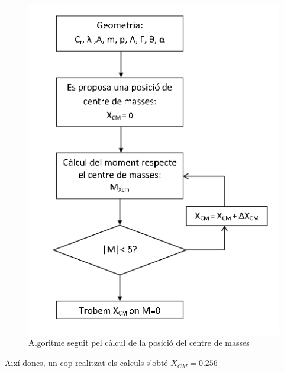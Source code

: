 \begin{figure}[h]
	\centering
	\includegraphics[scale=0.5]{./plots/algoritmeCM}
	\caption{Algoritme seguit pel càlcul de la posició del centre de masses}
	\label{AlgoritmeCM}
\end{figure}

Així doncs, un cop realitzat els calculs s'obté $X_{CM} = 0.256 $ 